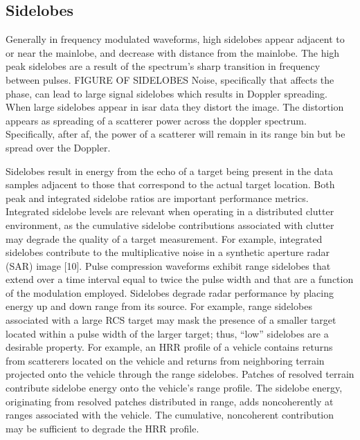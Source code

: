 \documentclass[class=report,11pt,crop=false]{standalone}
\begin{document}
    \subsection{Sidelobes}
    Generally in frequency modulated waveforms, high sidelobes appear adjacent to or near the mainlobe, and decrease with distance from the mainlobe. The high peak sidelobes are a result of the spectrum’s sharp transition in frequency between pulses.
    FIGURE OF SIDELOBES
    Noise, specifically that affects the phase, can lead to large signal sidelobes which results in Doppler spreading. 
    When large sidelobes appear in \gls{isar} data they distort the image. The distortion appears as spreading of a scatterer power across the doppler spectrum. Specifically, after \gls{af}, the power of a scatterer will remain in its range bin but be spread over the Doppler. 

    Sidelobes result in energy from the echo of a target being present in the data samples adjacent to those that correspond to the actual target location.  %
    Both peak and integrated sidelobe ratios are important performance metrics. Integrated sidelobe levels are relevant when operating in a distributed clutter environment, as the cumulative sidelobe contributions associated with clutter may degrade the quality of a target measurement. For example, integrated sidelobes contribute to the multiplicative noise in a synthetic aperture radar (SAR) image [10]. %
    Pulse compression waveforms exhibit range sidelobes that extend over a time interval equal to twice the pulse width and that are a function of the modulation employed. Sidelobes degrade radar performance by placing energy up and down range from its source. For example, range sidelobes associated with a large RCS target may mask the presence of a smaller target located within a pulse width of the larger target; thus, “low” sidelobes are a desirable property. %
    For example, an HRR profile of a vehicle contains returns from scatterers located on the vehicle and returns from neighboring terrain projected onto the vehicle through the range sidelobes. Patches of resolved terrain contribute sidelobe energy onto the vehicle’s range profile. The sidelobe energy, originating from resolved patches distributed in range, adds noncoherently at ranges associated with the vehicle. The cumulative, noncoherent contribution may be sufficient to degrade the HRR profile.
    
\end{document}
